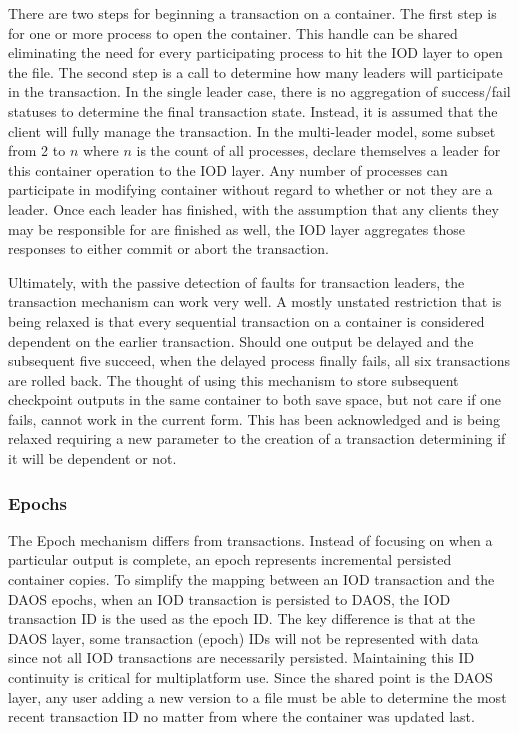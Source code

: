 \documentclass[conference]{IEEEtran}
\begin{document}
There are two steps for beginning a transaction on a container. The first step
is for one or more process to open the container. This handle can be shared
eliminating the need for every participating process to hit the IOD layer to
open the file. The second step is a call to determine how many leaders will
participate in the transaction. In the single leader case, there is no
aggregation of success/fail statuses to determine the final transaction state.
Instead, it is assumed that the client will fully manage the transaction. In
the multi-leader model, some subset from 2 to $n$ where $n$ is the count of all
processes, declare themselves a leader for this container operation to the IOD
layer. Any number of processes can participate in modifying container without
regard to whether or not they are a leader. Once each leader has finished, with
the assumption that any clients they may be responsible for are finished as
well, the IOD layer aggregates those responses to either commit or abort the
transaction.

Ultimately, with the passive detection of faults for transaction leaders, the
transaction mechanism can work very well. A mostly unstated restriction that is
being relaxed is that every sequential transaction on a container is considered
dependent on the earlier transaction. Should one output be delayed and the
subsequent five succeed, when the delayed process finally fails, all six
transactions are rolled back. The thought of using this mechanism to store
subsequent checkpoint outputs in the same container to both save space, but not
care if one fails, cannot work in the current form. This has been acknowledged
and is being relaxed requiring a new parameter to the creation of a transaction
determining if it will be dependent or not.

\subsubsection{Epochs}
The Epoch mechanism differs from transactions. Instead of focusing on when a
particular output is complete, an epoch represents incremental persisted
container copies.  To simplify the mapping between an IOD transaction and the
DAOS epochs, when an IOD transaction is persisted to DAOS, the IOD transaction
ID is the used as the epoch ID. The key difference is that at the DAOS layer,
some transaction (epoch) IDs will not be represented with data since not all
IOD transactions are necessarily persisted. Maintaining this ID continuity is
critical for multiplatform use. Since the shared point is the DAOS layer, any
user adding a new version to a file must be able to determine the most recent
transaction ID no matter from where the container was updated last.
\end{document}
